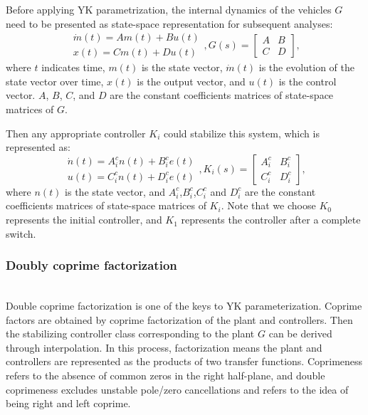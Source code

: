 \documentclass[journal]{IEEEtran}
\begin{document}
Before applying YK parametrization, the internal dynamics of the vehicles $G$ need to be presented as state-space representation for subsequent analyses:
\begin{equation}
  \begin{gathered}
    \dot{m}(t)=A m(t)+B u(t) \\
    x(t)=C m(t)+D u(t)
  \end{gathered}, G(s)=\left[\begin{array}{ll}
      A & B \\
      C & D
    \end{array}\right],
\end{equation}
where $t$ indicates time, $m(t)$ is the state vector, $\dot{m}(t)$ is the evolution of the state vector over time, $x(t)$ is the output vector, and $u(t)$ is the control vector. $A$, $B$, $C$, and $D$ are the constant coefficients matrices of state-space matrices of $G$.

Then any appropriate controller $K_i$ could stabilize this system, which is represented as:
\begin{equation}
  \begin{gathered}
    \dot{n}(t)=A_{i}^{c} n(t)+B_{i}^{c} e(t) \\
    u(t)=C_{i}^{c} n(t)+D_{i}^{c} e(t)
  \end{gathered}, K_{i}(s)=\left[\begin{array}{ll}
      A_{i}^{c} & B_{i}^{c} \\
      C_{i}^{c} & D_{i}^{c}
    \end{array}\right],
\end{equation}
where $n(t)$ is the state vector, and $A_i^c$,$B_i^c$,$C_i^c$ and $D_i^c$ are the constant coefficients matrices of state-space matrices of $K_i$. Note that we choose $K_0$ represents the initial controller, and $K_1$ represents the controller after a complete switch.

\subsubsection{Doubly coprime factorization}
\label{Section 3.2.2}
~\\

Double coprime factorization is one of the keys to YK parameterization. Coprime factors are obtained by coprime factorization of the plant and controllers. Then the stabilizing controller class corresponding to the plant $G$ can be derived through interpolation. In this process, factorization means the plant and controllers are represented as the products of two transfer functions. Coprimeness refers to the absence of common zeros in the right half-plane, and double coprimeness excludes unstable pole/zero cancellations and refers to the idea of being right and left coprime.
\end{document}
